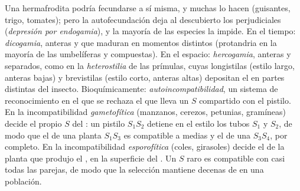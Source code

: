 \begin{proposition}\label{prop:b2:angiosperm-reproduction:selfing}
Una  hermafrodita podría fecundarse a sí misma, y muchas lo hacen
(guisantes, trigo, tomates); pero la autofecundación deja al descubierto
los   perjudiciales (\emph{depresión por endogamia}), y la
mayoría de las especies la impide. En el tiempo: \emph{dicogamia},
anteras y  que maduran en momentos distintos (protandria en la
mayoría de las umbelíferas y compuestas). En el espacio:
\emph{hercogamia}, anteras y  separados, como en la
\emph{heterostilia} de las prímulas, cuyas  longistilas (estilo
largo, anteras bajas) y brevistilas (estilo corto, anteras altas)
depositan el  en partes distintas del insecto. Bioquímicamente:
\emph{autoincompatibilidad}, un sistema de reconocimiento en el que se
rechaza el  que lleva un  $S$ compartido con el pistilo. En la
incompatibilidad \emph{gametofítica} (manzanos, cerezos, petunias,
gramíneas) decide el propio  $S$  del : un pistilo
$S_1S_2$ detiene en el estilo los tubos $S_1$ y $S_2$, de modo que el
 de una planta $S_1S_3$ es compatible a medias y el de una $S_3S_4$,
por completo. En la incompatibilidad \emph{esporofítica} (coles,
girasoles) decide el   de la planta que produjo el ,
en la superficie del . Un  $S$ raro es compatible con casi
todas las parejas, de modo que la selección mantiene decenas de 
en una población.
\end{proposition}
